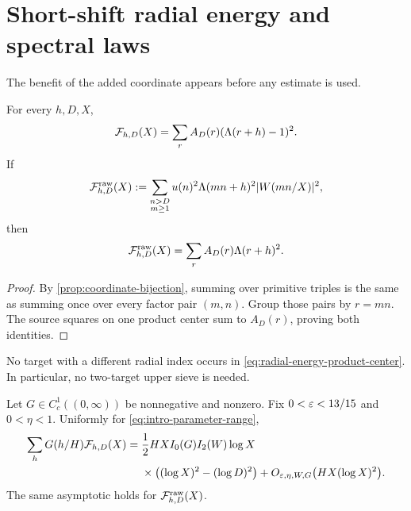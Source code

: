 \section{Short-shift radial energy and spectral laws}
\label{sec:short-shift-spectrum}

The benefit of the added coordinate appears before any estimate is used.

\begin{proposition}
\label{prop:exact-product-center-identity}
For every $h,D,X$,
\begin{equation}
 \mathcal F_{h,D}(X)
 =\sum_rA_D(r)(\Lambda(r+h)-1)^2.
 \label{eq:radial-energy-product-center}
\end{equation}
If
\begin{equation}
 \mathcal F^{\mathrm{raw}}_{h,D}(X):=
 \sum_{\substack{n>D\\m\geq1}}
 u(n)^2\Lambda(mn+h)^2|W(mn/X)|^2,
 \label{eq:raw-radial-energy}
\end{equation}
then
\begin{equation}
 \mathcal F^{\mathrm{raw}}_{h,D}(X)=\sum_rA_D(r)\Lambda(r+h)^2.
 \label{eq:raw-radial-product-center}
\end{equation}
\end{proposition}

\begin{proof}
By \cref{prop:coordinate-bijection}, summing over primitive triples is
the same as summing once over every factor pair $(m,n)$.  Group those
pairs by $r=mn$.  The source squares on one product center sum to
$A_D(r)$, proving both identities.
\end{proof}

No target with a different radial index occurs in
\eqref{eq:radial-energy-product-center}.  In particular, no two-target
upper sieve is needed.

\begin{theorem}
\label{thm:short-shift-radial-energy}
Let $G\in C_c^1((0,\infty))$ be nonnegative and nonzero.  Fix
$0<\varepsilon<13/15$ and $0<\eta<1$.  Uniformly for
\eqref{eq:intro-parameter-range},
\begin{equation}
 \begin{aligned}
 \sum_hG(h/H)\mathcal F_{h,D}(X)
 ={}&\frac12HX I_0(G)I_2(W)\log X\\
 &\times\bigl((\log X)^2-(\log D)^2\bigr)
 +O_{\varepsilon,\eta,W,G}\bigl(HX(\log X)^2\bigr).
 \end{aligned}
 \label{eq:short-shift-radial-energy}
\end{equation}
The same asymptotic holds for $\mathcal F^{\mathrm{raw}}_{h,D}(X)$.
\end{theorem}

